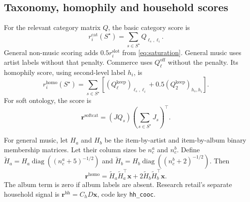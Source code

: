 \documentclass[11pt,a4paper]{article}
\newcommand{\code}[1]{\nolinkurl{#1}}
\newcommand{\diag}{\operatorname{diag}}
\newcommand{\sig}[1]{\mathrm{#1}}
\numberwithin{equation}{section}
\begin{document}
\subsection{Taxonomy, homophily and household scores}
For the relevant category matrix $Q$, the basic category score is
\begin{equation}
 r^{\sig{cat}}_i(S^\star)=\sum_{s\in S^\star}Q_{\ell_s,\ell_i}.
\end{equation}
General non-music scoring adds $0.5r_i^{\sig{slot}}$ from \eqref{eq:saturation}.
General music uses artist labels without that penalty. Commerce uses
$Q_\ell^{\mathrm{off}}$ without the penalty. Its homophily score, using second-level
label $h_i$, is
\begin{equation}
 r^{\sig{homo}}_i(S^\star)=\sum_{s\in S^\star}
 \left[(Q_\ell^{\mathrm{keep}})_{\ell_s,\ell_i}
       +0.5(Q_2^{\mathrm{keep}})_{h_s,h_i}\right].
\end{equation}
For soft ontology, the score is
\begin{equation}
 \bm r^{\sig{softcat}}=(JQ_s)\left(\sum_{s\in S^\star}J_s\right)^\top.
\end{equation}

For general music, let $H_a$ and $H_b$ be the item-by-artist and item-by-album binary
membership matrices. Let their column sizes be $n^a_c$ and $n^b_c$. Define
$\widetilde H_a=H_a\diag((n^a_c+5)^{-1/2})$ and
$\widetilde H_b=H_b\diag((n^b_c+2)^{-1/2})$. Then
\begin{equation}
 \bm r^{\sig{homo}}=\widetilde H_a\widetilde H_a^\top\bm x
                   +2\widetilde H_b\widetilde H_b^\top\bm x.
\end{equation}
The album term is zero if album labels are absent. Research retail's separate household
signal is $\bm r^{\sig{hh}}=C_hD\bm x$, code key \code{hh_cooc}.
\end{document}

